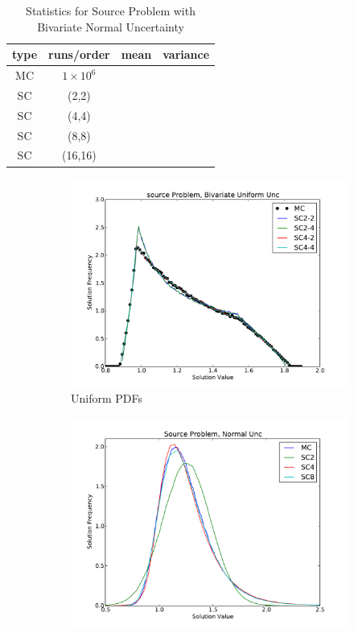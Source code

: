 \begin{table}[h!]
\begin{center}
\begin{tabular}{c c|l l}
type & runs/order & mean & variance \\ \hline
MC & $1\times10^6$ &  & \\
SC & (2,2)     &  &  \\
SC & (4,4)     &  &  \\
SC & (8,8)     &  & \\
SC & (16,16) &  & 
\end{tabular}
\end{center}
\caption{Statistics for Source Problem with Bivariate Normal Uncertainty}
\label{tab:2v source norm}
\end{table}

\begin{figure}[h]
\centering
  \begin{subfigure}[b]{0.45 \textwidth}
   \includegraphics[width=\textwidth]{../graphics/source_2v_uniform_pdfs}
   \caption{Uniform PDFs}
      \label{uni}
  \end{subfigure}
  \begin{subfigure}[b]{0.45\textwidth}
   \includegraphics[width=\textwidth]{../graphics/source_normal_pdfs}

\end{subfigure}
\end{figure}
